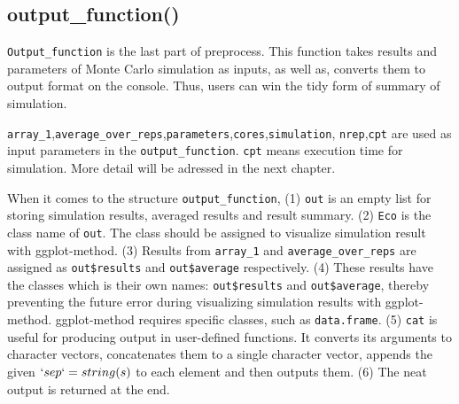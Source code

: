 \documentclass[11pt,a4paper]{article}
\begin{document}
\hypertarget{output_function}{%
\subsection{output\_function()}\label{output_function}}

\texttt{Output\_function} is the last part of preprocess. This function
takes results and parameters of Monte Carlo simulation as inputs, as
well as, converts them to output format on the console. Thus, users can
win the tidy form of summary of simulation.

\texttt{array\_1},\texttt{average\_over\_reps},\texttt{parameters},\texttt{cores},\texttt{simulation},
\texttt{nrep},\texttt{cpt} are used as input parameters in the
\texttt{output\_function}. \texttt{cpt} means execution time for
simulation. More detail will be adressed in the next chapter.

When it comes to the structure \texttt{output\_function}, (1)
\texttt{out} is an empty list for storing simulation results, averaged
results and result summary. (2) \texttt{Eco} is the class name of
\texttt{out}. The class should be assigned to visualize simulation
result with ggplot-method. (3) Results from \texttt{array\_1} and
\texttt{average\_over\_reps} are assigned as \texttt{out\$results} and
\texttt{out\$average} respectively. (4) These results have the classes
which is their own names: \texttt{out\$results} and
\texttt{out\$average}, thereby preventing the future error during
visualizing simulation results with ggplot-method. ggplot-method
requires specific classes, such as \texttt{data.frame}. (5) \texttt{cat}
is useful for producing output in user-defined functions. It converts
its arguments to character vectors, concatenates them to a single
character vector, appends the given \(`sep` = string(s)\) to each
element and then outputs them\autocite{DataCamp}. (6) The neat output is
returned at the end.
\end{document}
